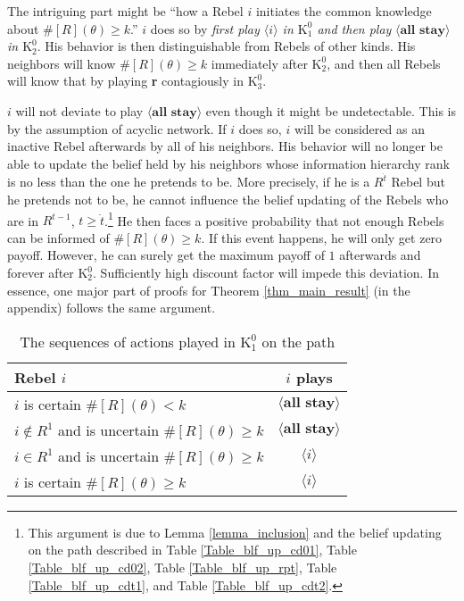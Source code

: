 \documentclass[12pt,letter]{article}
\newcommand{\Kappa}{\mathrm{K}}
\theoremstyle{definition}
\theoremstyle{remark}
\theoremstyle{claim}
\begin{document}
The intriguing part might be ``how a Rebel $i$ initiates the common knowledge about $\#[R](\theta)\geq k$.'' $i$ does so by \textit{first play $\langle i \rangle$ in $\Kappa^0_{1}$ and then play} $\langle \textbf{all stay} \rangle$ \textit{in $\Kappa^0_{2}$}. His behavior is then distinguishable from Rebels of other kinds. His neighbors will know $\#[R](\theta)\geq k$ immediately after $\Kappa^0_{2}$, and then all Rebels will know that by playing \textbf{r} contagiously in $\Kappa^0_{3}$. 

$i$ will not deviate to play $\langle \textbf{all stay} \rangle$ even though it might be undetectable. This is by the assumption of acyclic network. If $i$ does so, $i$ will be considered as an inactive Rebel afterwards by all of his neighbors. His behavior will no longer be able to update the belief held by his neighbors whose information hierarchy rank is no less than the one he pretends to be. More precisely, if he is a $R^{\dot{t}}$ Rebel but he pretends not to be, he cannot influence the belief updating of the Rebels who are in $R^{t-1}$, $t\geq \dot{t}$.\footnote{This argument is due to Lemma \ref{lemma_inclusion} and the belief updating on the path described in Table \ref{Table_blf_up_cd01}, Table \ref{Table_blf_up_cd02}, Table \ref{Table_blf_up_rpt}, Table \ref{Table_blf_up_cdt1}, and Table \ref{Table_blf_up_cdt2}.} 
He then faces a positive probability that not enough Rebels can be informed of $\#[R](\theta)\geq k$. If this event happens, he will only get zero payoff. However, he can surely get the maximum payoff of $1$ afterwards and forever after $\Kappa^0_2$. Sufficiently high discount factor will impede this deviation. In essence, one major part of proofs for Theorem \ref{thm_main_result} (in the appendix) follows the same argument.

\begin{table}[!htbp]
\caption{The sequences of actions played in $\Kappa^0_{1}$ on the path}
\label{Table_cd011}
\begin{center}
\begin{tabular}{l c}
Rebel $i$ 	 	&  	$i$ plays		 \\
\hline
\hline
$i$ is certain $\#[R](\theta)<k$ 	& 	$\langle \textbf{all stay} \rangle$	\\
$i\notin R^{1}$ and is uncertain $\#[R](\theta)\geq k$	& 	$\langle \textbf{all stay} \rangle$	\\
$i\in R^{1}$ and is uncertain $\#[R](\theta)\geq k$ &  $\langle i \rangle$  \\
$i$ is certain $\#[R](\theta)\geq k$ &  $\langle i \rangle$  \\
\hline
\end{tabular}
\end{center}
\end{table}
\end{document}
